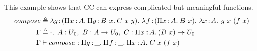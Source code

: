 \begin{exmp}
This example shows that CC can express complicated but meaningful functions.
	\begin{align*}
		compose &\triangleq \lam{g}{(\pitype{x}{A}{\pitype{y}{B\ x}{C\ x\ y}})}{\lam{f}{(\pitype{x}{A}{B\ x})}{\lam{x}{A}{g\ x\ (f\ x)}}} \\
		\Gamma &\triangleq \cdot,\ A : U_0,\ B : A \rightarrow U_0,\ C : \pitype{x}{A}{(B\ x) \rightarrow U_0}\\
		\Gamma &\vdash compose : \pitype{g}{\_}{\pitype{f}{\_}{\pitype{x}{A}{C\ x\ (f\ x)}}} 
	\end{align*}
\end{exmp}



